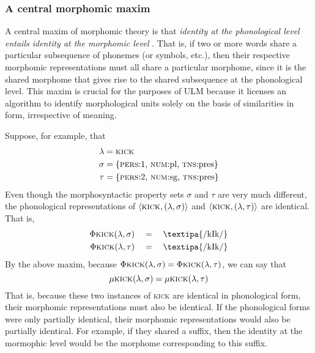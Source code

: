 {\subsubsection{A central morphomic maxim} A central maxim 
of morphomic theory is that
\emph{identity at the phonological 
level entails identity at the morphomic level} \citep{round:2011}. 
That is, if two 
or more words share a particular subsequence of phonemes 
(or symbols, etc.), then their respective morphomic representations 
must all share a particular morphome, since it is the shared 
morphome that gives rise to the shared subsequence at the 
phonological level. This maxim is crucial for the purposes 
of ULM because it licenses an algorithm to identify 
morphological units solely on the basis of similarities in 
form, irrespective of meaning.

Suppose, for example, that 
\begin{align*}
\lambda &= \textsc{kick} \\%
\sigma &= \{\text{\textsc{pers}:1, \textsc{num}:pl, \textsc{tns}:pres} \} \\%
\tau &=\{\text{\textsc{pers}:2, \textsc{num}:sg, \textsc{tns}:pres}\}
\end{align*}
Even though the morphosyntactic property sets $\sigma$ and $\tau$ are very much different,
the phonological representations of $\langle \textsc{kick}, (\lambda,\sigma) \rangle$
and $\langle \textsc{kick}, (\lambda,\tau) \rangle$ are identical. 
That is,
\begin{align*}
\Phi\textsc{kick}(\lambda,\sigma) \quad &= \quad \text{\textipa{/kIk/}} \\%
\Phi{\textsc{kick}}(\lambda,\tau) \quad &= \quad \text{\textipa{/kIk/}} %
\end{align*} 
By the above maxim, because
$\Phi{\textsc{kick}}(\lambda,\sigma) =  \Phi{\textsc{kick}}(\lambda,\tau)$, we can say that  %
\begin{equation*}
\mu{\textsc{kick}}(\lambda,\sigma) = \mu{\textsc{kick}}(\lambda,\tau) %
\end{equation*}
That is, because these two instances of \textsc{kick} are identical in 
phonological form, their morphomic representations must also be identical. 
If the 
phonological forms were only partially identical, their morphomic 
representations would also be partially identical. For example, if they 
shared a suffix, then the identity at the mormophic level would 
be the morphome corresponding to this suffix.

}
